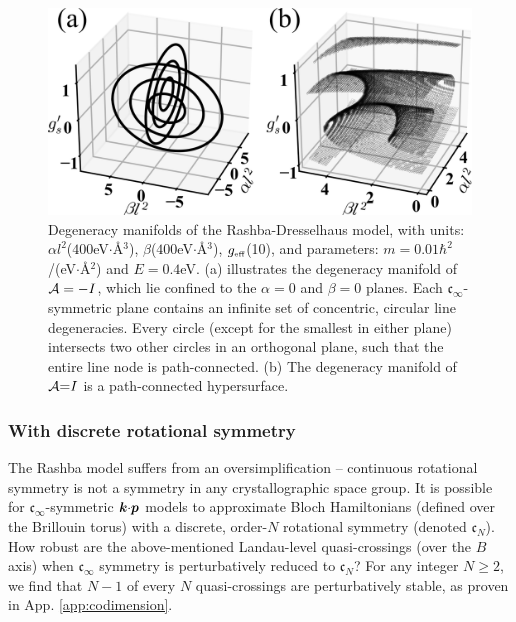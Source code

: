 \documentclass[aps, prb, showpacs, twocolumn, notitlepage, superscriptaddress]{revtex4-1}
\begin{document}
\begin{figure}
\includegraphics[width=1.0\columnwidth]{dgn.png}
\caption{Degeneracy manifolds of the Rashba-Dresselhaus model, with units: $\alpha l^2$($400$eV$\cdot$\AA$^3$), $\beta$($400$eV$\cdot$\AA$^3$), $g_{\scriptscriptstyle{\text{eff}}}$(10), and parameters: $m=0.01\hbar^2$/(eV$\cdot$\AA$^2$) and $E=0.4$eV. (a) illustrates the degeneracy manifold of ${\cal A}=-I$, which lie confined to  the $\alpha{=}0$ and $\beta{=}0$ planes. Each $\mathfrak{c}_{\infty}$-symmetric plane contains an infinite set of concentric, circular line degeneracies. Every circle (except for the smallest in either plane)  intersects two other circles in an orthogonal plane, such that the entire line node is path-connected. (b) The degeneracy manifold of ${\cal A}{=}I$ is a path-connected hypersurface.  \label{fig:dgn}}
\end{figure}

\subsubsection{With discrete rotational symmetry}


The Rashba model suffers from an oversimplification -- continuous rotational symmetry is not a symmetry in any crystallographic space group. It is possible for $\mathfrak{c}_{\infty}$-symmetric $\boldsymbol{k}{\cdot}\boldsymbol{p}$ models to approximate Bloch Hamiltonians (defined over the Brillouin torus) with a discrete, order-$N$ rotational symmetry (denoted $\mathfrak{c}_N$). How robust are the above-mentioned Landau-level quasi-crossings  (over the $B$ axis) when $\mathfrak{c}_{\infty}$ symmetry is perturbatively reduced to $\mathfrak{c}_N$? For any  integer $N{\geq}2$, we find that $N{-}1$ of every $N$ quasi-crossings  are perturbatively stable, as proven in App. \ref{app:codimension}.
\end{document}

